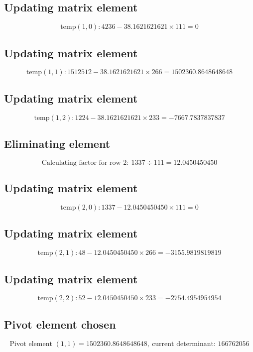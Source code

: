 \documentclass{article}
\begin{document}
\subsection*{ \vspace{1em} Updating matrix element}
\[
\text{temp}( 1,0 ): 4236 - 38.1621621621 \times 111 = 0
\]
\subsection*{ \vspace{1em} Updating matrix element}
\[
\text{temp}( 1,1 ): 1512512 - 38.1621621621 \times 266 = 1502360.8648648648
\]
\subsection*{ \vspace{1em} Updating matrix element}
\[
\text{temp}( 1,2 ): 1224 - 38.1621621621 \times 233 = -7667.7837837837
\]
\subsection*{ \vspace{1em} Eliminating element}
\[
\text{Calculating factor for row } 2:\ 1337 \div 111 = 12.0450450450
\]
\subsection*{ \vspace{1em} Updating matrix element}
\[
\text{temp}( 2,0 ): 1337 - 12.0450450450 \times 111 = 0
\]
\subsection*{ \vspace{1em} Updating matrix element}
\[
\text{temp}( 2,1 ): 48 - 12.0450450450 \times 266 = -3155.9819819819
\]
\subsection*{ \vspace{1em} Updating matrix element}
\[
\text{temp}( 2,2 ): 52 - 12.0450450450 \times 233 = -2754.4954954954
\]
\subsection*{ \vspace{1em} Pivot element chosen}
\[
\text{Pivot element } ( 1,1 ) = 1502360.8648648648,\ \text{current determinant: } 166762056
\]
\end{document}
